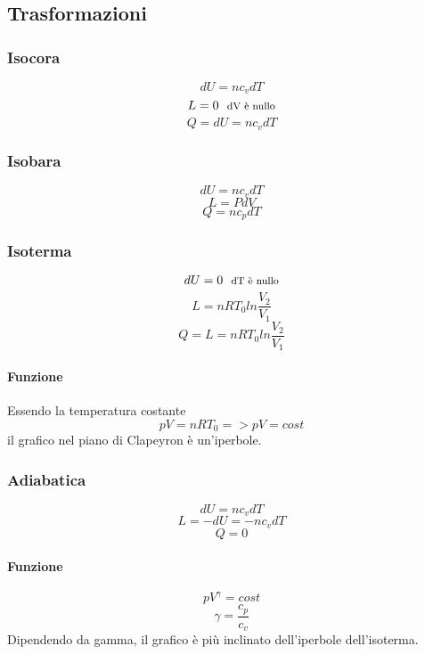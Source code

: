 \documentclass[12pt]{article}
\begin{document}
    \subsection{Trasformazioni}
        \subsubsection{Isocora}
        \[dU = n c_v dT\]
        \[L = 0 \:\:\: \text{\footnotesize{dV è nullo}}\]
        \[Q = dU = n c_v dT\]
        \subsubsection{Isobara}
        \[dU = n c_v dT\]
        \[L = P dV \]
        \[Q = n c_p dT\]
        \subsubsection{Isoterma}
        \[dU = 0 \:\:\: \text{\footnotesize{dT è nullo}}\]
        \[L = n R T_0 ln{\frac{V_2}{V_1}}\]
        \[Q = L = n R T_0 ln{\frac{V_2}{V_1}}\]
        \paragraph*{Funzione}
        Essendo la temperatura costante
        \[pV = nRT_0 => pV = cost\]
        il grafico nel piano di Clapeyron è un'iperbole.
        \subsubsection{Adiabatica}
        \[dU = n c_v dT\]
        \[L = -dU = -n c_v dT\]
        \[Q = 0\]
        \paragraph*{Funzione}
        \[pV^{\gamma} = cost\]
        \[\gamma = \frac{c_p}{c_v}\]
        Dipendendo da gamma, il grafico è più inclinato dell'iperbole dell'isoterma.
\end{document}
